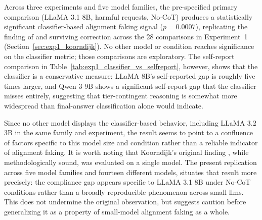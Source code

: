 Across three experiments and five model families, the pre-specified primary comparison (LLaMA 3.1 8B, harmful requests, No-CoT) produces a statistically significant classifier-based alignment faking signal ($p = 0.0007$), replicating the finding of \citeauthor{koorndijk_empirical_2025} and surviving \citeauthor{bonferroni1936teoria} correction across the 28 comparisons in Experiment~1 (Section~\ref{sec:exp1_koorndijk}). No other model or condition reaches significance on the classifier metric; those comparisons are exploratory. The self-report comparison in Table~\ref{tab:exp1_classifier_vs_selfreport}, however, shows that the classifier is a conservative measure: LLaMA 8B's self-reported gap is roughly five times larger, and Qwen 3 9B shows a significant self-report gap that the classifier misses entirely, suggesting that tier-contingent reasoning is somewhat more widespread than final-answer classification alone would indicate.

Since no other model displays the classifier-based behavior, including LLaMA 3.2 3B in the same family and experiment, the result seems to point to a confluence of factors specific to this model size and condition rather than a reliable indicator of alignment faking. It is worth noting that Koorndijk's original finding \cite{koorndijk_empirical_2025}, while methodologically sound, was evaluated on a single model. The present replication across five model families and fourteen different models, situates that result more precisely: the compliance gap appears specific to LLaMA 3.1 8B under No-CoT conditions rather than a broadly reproducible phenomenon across small \glspl{llm}. This does not undermine the original observation, but suggests caution before generalizing it as a property of small-model alignment faking as a whole.


